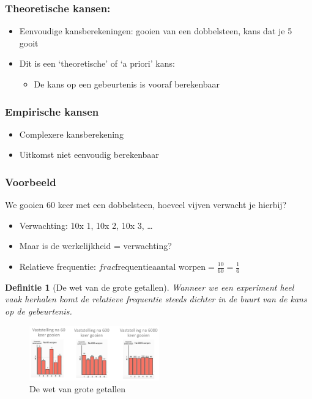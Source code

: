 \documentclass{article}
\newtheorem{theorem}{Definitie}[section]
\begin{document}
\subsubsection{Theoretische kansen:}

\begin{itemize}
    \item Eenvoudige kansberekeningen: gooien van een dobbelsteen, kans dat je 5 gooit
    \item Dit is een `theoretische' of `a priori' kans:
    \begin{itemize}
        \item De kans op een gebeurtenis is vooraf berekenbaar
    \end{itemize}
\end{itemize}

\subsubsection{Empirische kansen}

\begin{itemize}
    \item Complexere kansberekening
    \item Uitkomst niet eenvoudig berekenbaar
\end{itemize}


\subsubsection{Voorbeeld}
We gooien 60 keer met een dobbelsteen, hoeveel vijven verwacht je hierbij?

\begin{itemize}
    \item Verwachting: 10x 1, 10x 2, 10x 3, \dots
    \item Maar is de werkelijkheid = verwachting?
    \item Relatieve frequentie: $frac{\text{frequentie}}{\text{aantal worpen}} = \frac{10}{60} = \frac16$
\end{itemize}

\begin{theorem}[De wet van de grote getallen]
    Wanneer we een experiment heel vaak herhalen komt de relatieve frequentie steeds dichter in de buurt van de kans op de gebeurtenis.
\end{theorem}

\begin{figure}[H]
    \centering
    \includegraphics[width=0.5\textwidth]{wet-grote-getallen.png}
    \caption{De wet van grote getallen}
\end{figure}
\end{document}
